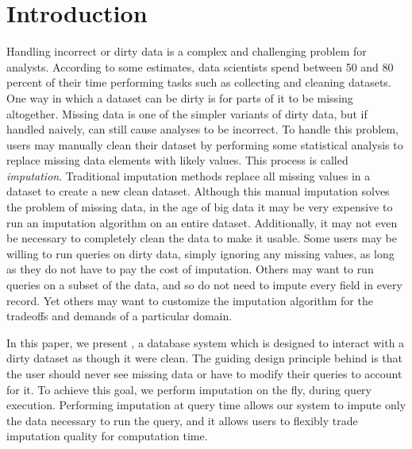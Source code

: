 \section{Introduction}

Handling incorrect or dirty data is a complex and challenging problem for analysts.
According to some estimates, data scientists spend between 50 and 80 percent of their
time performing tasks such as collecting and cleaning datasets\cite{data-science-cleaning}.
One way in which a dataset can be dirty is for parts of it to be missing altogether.
Missing data is one of the simpler variants of dirty data, but if handled naively, can still cause analyses to be incorrect.
To handle this problem, users may manually clean their dataset by performing
some statistical analysis to replace missing data elements with likely values.
This process is called \emph{imputation}.
Traditional imputation methods replace all missing values in a dataset to create a new clean dataset.
Although this manual imputation solves the problem of missing data, in the age of big data it may be very expensive to run an imputation algorithm on an entire dataset.
Additionally, it may not even be necessary to completely clean the data to make it usable.
Some users may be willing to run queries on dirty data, simply ignoring any missing values, as long as they do not have to pay the cost of imputation.
Others may want to run queries on a subset of the data, and so do not need to impute
every field in every record. Yet others may want to customize the 
imputation algorithm for the tradeoffs and demands of a particular domain.

In this paper, we present \ProjectName{}, a database system which is designed to interact with a dirty dataset as though it were clean.
The guiding design principle behind \ProjectName{} is that the user should never see missing data or have to modify their queries to account for it.
To achieve this goal, we perform imputation on the fly, during query execution.
Performing imputation at query time allows our system to impute only the data necessary to run the query, and it allows users to flexibly trade imputation quality for computation time.

